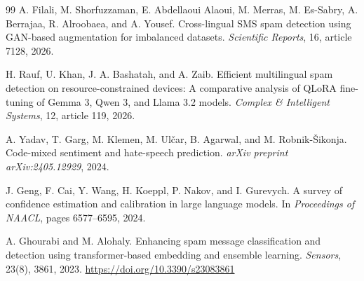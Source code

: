 \documentclass[11pt]{article}
\begin{document}
\begin{thebibliography}{99}
A. Filali, M. Shorfuzzaman, E. Abdellaoui Alaoui, M. Merras, M. Es-Sabry, A. Berrajaa, R. Alroobaea, and A. Yousef.
Cross-lingual SMS spam detection using GAN-based augmentation for imbalanced datasets.
\textit{Scientific Reports}, 16, article 7128, 2026.

H. Rauf, U. Khan, J. A. Bashatah, and A. Zaib.
Efficient multilingual spam detection on resource-constrained devices: A comparative analysis of QLoRA fine-tuning of Gemma 3, Qwen 3, and Llama 3.2 models.
\textit{Complex \& Intelligent Systems}, 12, article 119, 2026.

A. Yadav, T. Garg, M. Klemen, M. Ul\v{c}ar, B. Agarwal, and M. Robnik-\v{S}ikonja.
Code-mixed sentiment and hate-speech prediction.
\textit{arXiv preprint arXiv:2405.12929}, 2024.

J. Geng, F. Cai, Y. Wang, H. Koeppl, P. Nakov, and I. Gurevych.
A survey of confidence estimation and calibration in large language models.
In \textit{Proceedings of NAACL}, pages 6577--6595, 2024.

A. Ghourabi and M. Alohaly.
Enhancing spam message classification and detection using transformer-based embedding and ensemble learning.
\textit{Sensors}, 23(8), 3861, 2023.
\url{https://doi.org/10.3390/s23083861}

\end{thebibliography}
\end{document}
